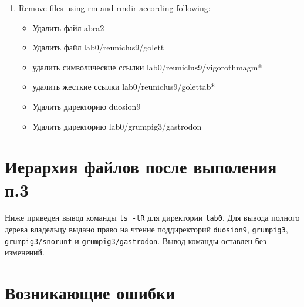 \documentclass[11pt]{article}
\begin{document}
\begin{enumerate}
\begin{itemize}
	\end{itemize}
	\item Remove files using rm and rmdir according following:
	\begin{itemize}
	\item Удалить файл abra2
	\item Удалить файл lab0/reuniclus9/golett
	\item удалить символические ссылки lab0/reuniclus9/vigorothmagm*
	\item удалить жесткие ссылки lab0/reuniclus9/golettab*
	\item Удалить директорию duosion9
	\item Удалить директорию lab0/grumpig3/gastrodon
	\end{itemize}
\end{enumerate}
\pagebreak{}
\section{Иерархия файлов после выполения п.3}
	Ниже приведен вывод команды \texttt{ls -lR} для директории  \texttt{lab0}. 
Для вывода полного дерева владельцу выдано право на чтение поддиректорий \texttt{duosion9}, \texttt{grumpig3},\\ \texttt{grumpig3/snorunt} и \texttt{grumpig3/gastrodon}. Вывод команды оставлен без изменений.\\
\small

\large

\section{Возникающие ошибки}
\end{document}
